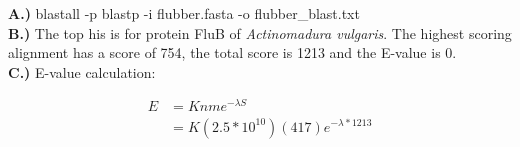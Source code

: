 \documentclass[10pt]{article} %
\begin{document}
\textbf{A.)} blastall -p blastp -i flubber.fasta -o flubber\_blast.txt\\
\textbf{B.)} The top his is for protein FluB of \textit{Actinomadura vulgaris}.
The highest scoring alignment has a score of 754, the total score is 1213 and the
E-value is 0.\\
\textbf{C.)} E-value calculation:

\begin{align*}
  E &= Knme^{-\lambda S}\\
  &= K(2.5*10^{10})(417)e^{-\lambda * 1213}\\
\end{align*}
\end{document}
